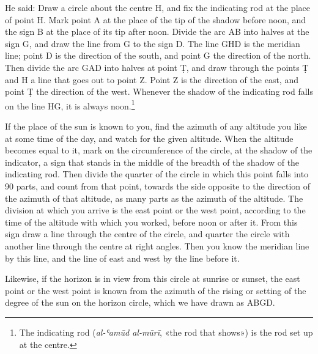 \documentclass[11pt]{article}
\newcommand{\ArPage}[1]{\marginpar{\footnotesize\color{gray}Ar.\,p.\,#1}}
\begin{document}
\par \ArPage{36}He said: Draw a circle about the centre H, and fix the indicating rod at the place of point H. Mark point A at the place of the tip of the shadow before noon, and the sign B at the place of its tip after noon. Divide the arc AB into halves at the sign G, and draw the line from G to the sign D. The line GHD is the meridian line; point D is the direction of the south, and point G the direction of the north. Then divide the arc GAD into halves at point Ṭ, and draw through the points Ṭ and H a line that goes out to point Z. Point Z is the direction of the east, and point Ṭ the direction of the west. Whenever the shadow of the indicating rod falls on the line HG, it is always noon.\footnote{The indicating rod (\emph{al-ʿamūd al-mūrī}, «the rod that shows») is the rod set up at the centre.}\par
\par If the place of the sun is known to you, find the azimuth of any altitude you like at some time of the day, and watch for the given altitude. When the altitude becomes equal to it, mark on the circumference of the circle, at the shadow of the indicator, a sign that stands in the middle of the breadth of the shadow of the indicating rod. Then divide the quarter of the circle in which this point falls into 90 parts, and count from that point, towards the side opposite to the direction of the azimuth of that altitude, as many parts as the azimuth of the altitude. The division at which you arrive is the east point or the west point, according to the time of the altitude with which you worked, before noon or after it. From this sign draw a line through the centre of the circle, and quarter the circle with another line through the centre at right angles. Then you know the meridian line by this line, and the line of east and west by the line before it.\par
\par Likewise, if the horizon is in view from this circle at sunrise or sunset, the east point or the west point is known from the azimuth of the rising or setting of the degree of the sun on the horizon circle, which we have drawn as ABGD.\par
\end{document}
